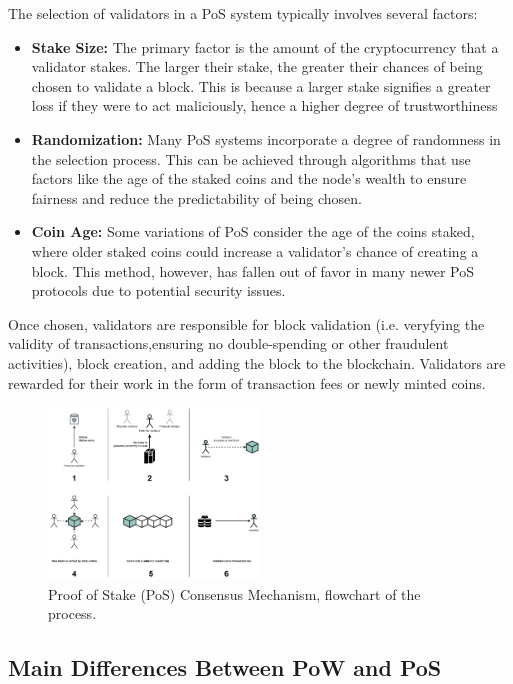 The selection of validators in a PoS system typically involves several factors:
\begin{itemize}
    \item \textbf{Stake Size:} The primary factor is the amount of the cryptocurrency that a validator stakes. The larger their stake, the greater their chances of being chosen to validate a block. This is because a larger stake signifies a greater loss if they were to act maliciously, hence a higher degree of trustworthiness
    \item \textbf{Randomization:} Many PoS systems incorporate a degree of randomness in the selection process. This can be achieved through algorithms that use factors like the age of the staked coins and the node's wealth to ensure fairness and reduce the predictability of being chosen.
    \item \textbf{Coin Age: } Some variations of PoS consider the age of the coins staked, where older staked coins could increase a validator's chance of creating a block. This method, however, has fallen out of favor in many newer PoS protocols due to potential security issues.
\end{itemize}

Once chosen, validators are responsible for block validation (i.e. veryfying the validity of transactions,ensuring no double-spending or other fraudulent activities), block creation, and adding the block to the blockchain. Validators are rewarded for their work in the form of transaction fees or newly minted coins.\\

\begin{figure}[htp]
    \centering
    \includegraphics[width=0.5\textwidth]{images/pos.png}
    \caption{Proof of Stake (PoS) Consensus Mechanism, flowchart of the process.}
    \label{fig:pos}
\end{figure}

\newpage
\subsection{Main Differences Between PoW and PoS}

